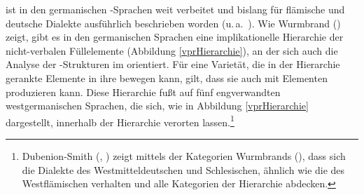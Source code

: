  \hai{{\VPR}} ist in den germanischen \hai{{\OV}}-Sprachen weit verbeitet und bislang für flämische und deutsche Dialekte ausführlich beschrieben worden (u.\,a.\, \citealt{Loetscher1978,HaegemanRiemsdijk1986,Dikken1989,Dikken1994,Dikken1995,Dikken1996,BestenBroekhuis1992,Hoecksema1994,Vikner2001,Wurmbrand2006,DubenionSmith2010,DubenionSmith2011,Salzmann2011}). Wie Wurmbrand (\citeyear[273–284]{Wurmbrand2006}) zeigt, gibt es in den germanischen Sprachen eine implikationelle Hierarchie der nicht-ver\-ba\-len Füllelemente  (Abbildung \ref{vprHierarchie}), an der sich auch die Analyse der \hai{{\VPR}}-Struk\-tu\-ren im \hai{{\LiJi}} orientiert. Für eine Varietät, die in der Hierarchie  gerankte Elemente in ihre  bewegen kann, gilt, dass sie auch \hai{{\VPR}} mit  Elementen produzieren kann. Diese Hierarchie fußt auf fünf engverwandten westgermanischen Sprachen, die sich, wie in Abbildung \ref{vprHierarchie} dargestellt, innerhalb der Hierarchie verorten lassen.\footnote{Dubenion-Smith (\citeyear[124–127]{DubenionSmith2010}, \citeyear[288f]{DubenionSmith2011}) zeigt mittels der Kategorien Wurmbrands (\citeyear{Wurmbrand2006}), dass sich die Dialekte des Westmitteldeutschen und Schlesischen, ähnlich wie die des Westflämischen verhalten und alle Kategorien der Hierarchie abdecken.} \\ 


